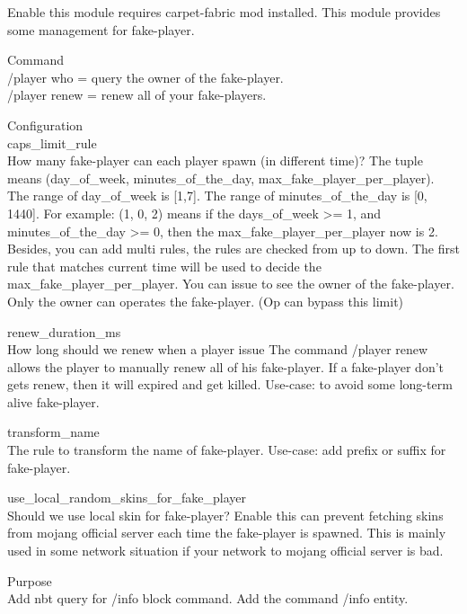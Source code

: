 

Enable this module requires carpet-fabric mod installed.
This module provides some management for fake-player.




Command\\
/player who = query the owner of the fake-player.\\
/player renew = renew all of your fake-players.

Configuration\\
caps\_limit\_rule\\
How many fake-player can each player spawn (in different time)?
The tuple means (day\_of\_week, minutes\_of\_the\_day, max\_fake\_player\_per\_player).
The range of day\_of\_week is [1,7].
The range of minutes\_of\_the\_day is [0, 1440].
For example: (1, 0, 2) means if the days\_of\_week >= 1, and minutes\_of\_the\_day >= 0, then the max\_fake\_player\_per\_player now is 2.
Besides, you can add multi rules, the rules are checked from up to down.
The first rule that matches current time will be used to decide the max\_fake\_player\_per\_player.
You can issue  to see the owner of the fake-player.
Only the owner can operates the fake-player. (Op can bypass this limit)

renew\_duration\_ms\\
How long should we renew when a player issue 
The command /player renew allows the player to manually renew all of his fake-player.
If a fake-player don't gets renew, then it will expired and get killed.
Use-case: to avoid some long-term alive fake-player.

transform\_name\\
The rule to transform the name of fake-player.
Use-case: add prefix or suffix for fake-player.

use\_local\_random\_skins\_for\_fake\_player\\
Should we use local skin for fake-player?
Enable this can prevent fetching skins from mojang official server each time the fake-player is spawned.
This is mainly used in some network situation if your network to mojang official server is bad.




Purpose\\
Add nbt query for /info block command.
Add the command /info entity.



